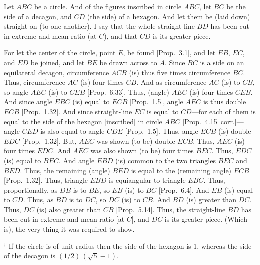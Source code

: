 \begin{Parallel}{}{}
{Let $ABC$ be a circle. And of the figures inscribed in circle $ABC$, 
let $BC$ be the side of a decagon, and $CD$ (the side) of a hexagon.
And let them be (laid down) straight-on (to one another). I say that
the whole straight-line $BD$ has been cut in extreme and mean
ratio (at $C$), and that   $CD$ is its greater piece. \\

\epsfysize=2.25in
\centerline{}

For let the center of the circle, point $E$, be found [Prop.~3.1],
and let $EB$, $EC$, and $ED$ be joined, and let $BE$ be
drawn across to $A$. Since $BC$ is a side on an equilateral decagon,
circumference $ACB$ (is) thus five times circumference $BC$. Thus,
circumference $AC$ (is) four times $CB$. And as circumference $AC$
(is) to $CB$, so angle $AEC$ (is) to $CEB$ [Prop.~6.33]. Thus,
(angle) $AEC$ (is) four times $CEB$. And since angle $EBC$
(is) equal to $ECB$ [Prop.~1.5], angle $AEC$ is thus double $ECB$ [Prop.~1.32]. 
And since straight-line $EC$ is equal to $CD$---for each of them is equal
to the side of the hexagon [inscribed] in circle $ABC$ [Prop.~4.15~corr.]---
angle $CED$ is also equal to angle $CDE$ [Prop.~1.5]. Thus,
angle $ECB$ (is) double $EDC$ [Prop.~1.32]. But,
$AEC$ was shown (to be) double $ECB$. Thus, $AEC$ (is) four times
$EDC$. And $AEC$ was also shown (to be) four times $BEC$. 
Thus, $EDC$ (is) equal to $BEC$. And angle $EBD$ (is) common
to the two triangles $BEC$ and $BED$. Thus, the remaining (angle)
$BED$ is equal to the (remaining angle) $ECB$ [Prop.~1.32]. 
Thus, triangle $EBD$ is equiangular to triangle $EBC$. Thus,
proportionally, as $DB$ is to $BE$, so $EB$ (is) to $BC$ [Prop.~6.4].
And $EB$ (is) equal to $CD$. Thus, as $BD$ is to $DC$, so $DC$
(is) to $CB$. And $BD$ (is) greater than $DC$. Thus,
$DC$ (is) also greater than $CB$ [Prop.~5.14]. Thus, the
straight-line $BD$ has been cut in extreme and mean ratio [at $C$],
and $DC$  is its greater piece. (Which is), the very thing it was required to show.}
\end{Parallel}{\footnotesize\noindent$^\dag$ If the circle is of unit radius
then the side of the hexagon is 1, whereas the side of the decagon is $(1/2)\,(\sqrt{5}-1)$.}

